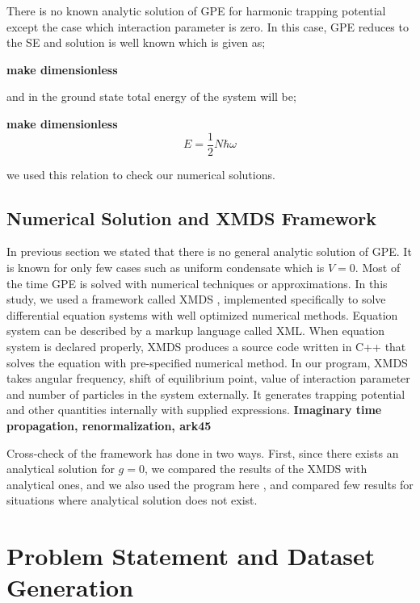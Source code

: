 \documentclass[a4paper,times,12pt]{article}
\begin{document}
There is no known analytic solution of GPE for harmonic trapping potential except the case which interaction parameter is zero. In this case, GPE reduces to the SE and solution is well known which is given as;

\textbf{make dimensionless}
\begin{equation}
\label{eq:GPE_SE}
\end{equation}

\noindent and in the ground state total energy of the system will be;

\textbf{make dimensionless}
\begin{equation}
\label{eq:GPE_no_inter_GSE}
E = \frac{1}{2}N\hbar\omega
\end{equation}

\noindent we used this relation to check our numerical solutions. 


\subsection{Numerical Solution and XMDS Framework}

In previous section we stated that there is no general analytic solution of GPE. It is known for only few cases such as uniform condensate which is $V = 0$. Most of the time GPE is solved with numerical techniques or approximations. In this study, we used a framework called XMDS \cite{dennis2013xmds2}, implemented specifically to solve differential equation systems with well optimized numerical methods. Equation system can be described by a markup language called XML.  When equation system is declared properly, XMDS produces a source code written in C++ that solves the equation with pre-specified numerical method. In our program, XMDS takes angular frequency, shift of equilibrium point, value of interaction parameter and number of particles in the system externally. It generates trapping potential and other quantities internally with supplied expressions. \textbf{Imaginary time propagation, renormalization, ark45}


Cross-check of the framework has done in two ways. First, since there exists an analytical solution for $g = 0$, we compared the results of the XMDS with analytical ones, and we also used the program here \cite{muruganandam2009fortran}, and compared few results for situations where analytical solution does not exist.  


\section{Problem Statement and Dataset Generation}
\label{sec:Problem statement}
\end{document}
